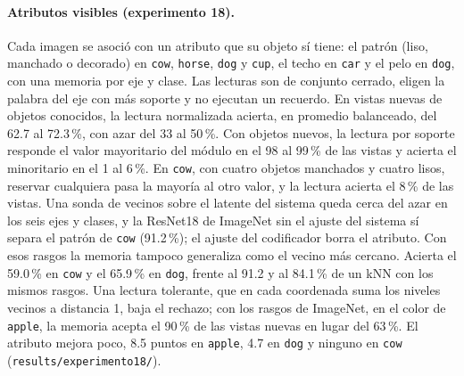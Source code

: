 \paragraph{Atributos visibles (experimento 18).}
Cada imagen se asoció con un atributo que su objeto sí tiene: el patrón (liso, manchado o
decorado) en \texttt{cow}, \texttt{horse}, \texttt{dog} y \texttt{cup}, el techo en
\texttt{car} y el pelo en \texttt{dog}, con una memoria por eje y clase.
Las lecturas son de conjunto cerrado, eligen la palabra del eje con más soporte y no
ejecutan un recuerdo.
En vistas nuevas de objetos conocidos, la lectura normalizada acierta, en promedio
balanceado, del 62.7 al 72.3\,\%, con azar del 33 al 50\,\%.
Con objetos nuevos, la lectura por soporte responde el valor mayoritario del módulo en el
98 al 99\,\% de las vistas y acierta el minoritario en el 1 al 6\,\%.
En \texttt{cow}, con cuatro objetos manchados y cuatro lisos, reservar cualquiera pasa la
mayoría al otro valor, y la lectura acierta el 8\,\% de las vistas.
Una sonda de vecinos sobre el latente del sistema queda cerca del azar en los seis ejes
y clases, y la ResNet18 de ImageNet sin el ajuste del sistema sí separa el patrón de
\texttt{cow} (91.2\,\%); el ajuste del codificador borra el atributo.
Con esos rasgos la memoria tampoco generaliza como el vecino más cercano.
Acierta el 59.0\,\% en \texttt{cow} y el 65.9\,\% en \texttt{dog}, frente al 91.2 y al
84.1\,\% de un kNN con los mismos rasgos.
Una lectura tolerante, que en cada coordenada suma los niveles vecinos a distancia 1,
baja el rechazo; con los rasgos de ImageNet, en el color de \texttt{apple}, la memoria acepta el 90\,\% de las vistas
nuevas en lugar del 63\,\%.
El atributo mejora poco, 8.5 puntos en \texttt{apple}, 4.7 en \texttt{dog} y ninguno en
\texttt{cow} (\texttt{results/experimento18/}).

